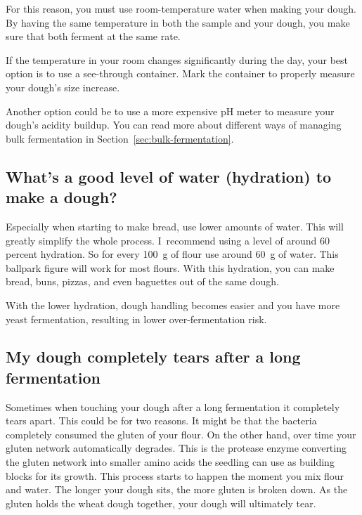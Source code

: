 For this reason, you must use room-temperature water when
making your dough. By having the same temperature in both the sample
and your dough, you make sure that both ferment at the same rate.

If the temperature in your room changes significantly during the day, your
best option is to use a see-through container. Mark the container to properly
measure your dough's size increase.

Another option could be to use a more expensive pH meter to measure your
dough's acidity buildup. You can read more about different ways of managing
bulk fermentation in Section~\ref{sec:bulk-fermentation}.

\subsection{What's a good level of water (hydration) to make a dough?}

Especially when starting to make bread, use lower amounts of water. This will
greatly simplify the whole process. I~recommend using a level of around 60
percent hydration. So for every \qty{100}{\gram} of flour use around \qty{60}{\gram} of water.
This ballpark figure will work for most flours. With this hydration, you can
make bread, buns, pizzas, and even baguettes out of the same dough.

With the lower hydration, dough handling becomes easier and you have more yeast
fermentation, resulting in lower over-fermentation risk.

\subsection{My dough completely tears after a long fermentation}

Sometimes when touching your dough after a long fermentation
it completely tears apart. This could be for two reasons. It might
be that the bacteria completely consumed the gluten of your flour.
On the other hand, over time your gluten network automatically
degrades. This is the protease enzyme converting the gluten
network into smaller amino acids the seedling can use as
building blocks for its growth. This process starts to happen
the moment you mix flour and water. The longer your dough sits,
the more gluten is broken down. As the gluten holds the
wheat dough together, your dough will ultimately tear.

